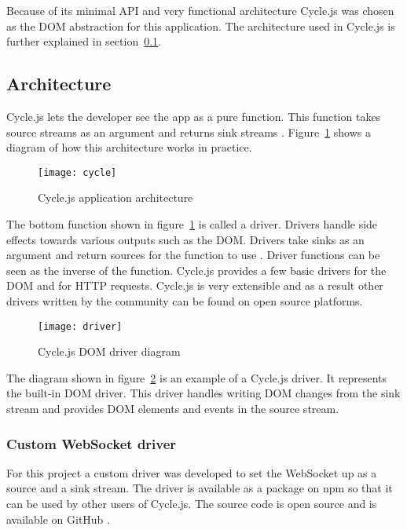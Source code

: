 Because of its minimal API and very functional architecture Cycle.js was chosen as the DOM abstraction for this application. The architecture used in Cycle.js is further explained in  section~\ref{sec:arch}.

\subsection{Architecture}
\label{sec:arch}

Cycle.js lets the developer see the app as a pure function. This  function takes source streams as an argument and returns sink streams \cite{cycle}. Figure~\ref{figure:cycle} shows a diagram of how this architecture works in practice.

\begin{figure}[H]
	\centering
	\texttt{[image: cycle]}
	\caption{Cycle.js application architecture \cite{cycle}}
	\label{figure:cycle}
\end{figure}

The bottom function shown in figure~\ref{figure:cycle} is called a driver. Drivers handle side effects towards various outputs such as the DOM. Drivers take sinks as an argument and return sources for the  function to use \cite{cycle-drivers}. Driver functions can be seen as the inverse of the  function. Cycle.js provides a few basic drivers for the DOM and for HTTP requests. Cycle.js is very extensible \cite{cycle-drivers} and as a result other drivers written by the community can be found on open source platforms.

\begin{figure}[H]
	\centering
	\texttt{[image: driver]}
	\caption{Cycle.js DOM driver diagram \cite{cycle-drivers}}
	\label{figure:driver}
\end{figure}

The diagram shown in figure~\ref{figure:driver} is an example of a Cycle.js driver. It represents the built-in DOM driver. This driver handles writing DOM changes from the sink stream and provides DOM elements and events in the source stream.

\subsubsection{Custom WebSocket driver}

For this project a custom driver was developed to set the WebSocket up as a source and a sink stream. The driver is available as a package on npm \cite{driver-npm} so that it can be used by other users of Cycle.js. The source code is open source and is available on GitHub \cite{driver-github}.

